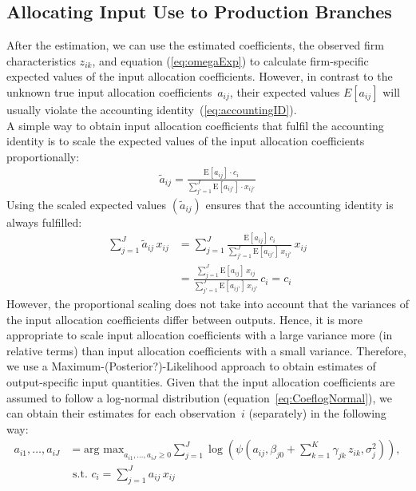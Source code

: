 \documentclass[12pt]{article}
\begin{document}
\subsection{Allocating Input Use to Production Branches}
\label{sec:obtaining-output-specific-input-quantities}
After the estimation, we can use the estimated coefficients, the observed firm characteristics $z_{ik}$, and equation (\ref{eq:omegaExp}) to calculate firm-specific expected values of the input allocation coefficients.
However, in contrast to the unknown true input allocation coefficients~$a_{ij}$, their expected values $E[a_{ij}]$ will usually violate the accounting identity~(\ref{eq:accountingID}). 
\\
A simple way to obtain input allocation coefficients that fulfil the accounting identity is to scale the expected values of the input allocation coefficients proportionally:
\begin{align}
\tilde{a}_{ij}=\frac{\text{E}[a_{ij}]\cdot c_i}{\sum_{j'=1}^J 
\text{E}[a_{ij'}]\cdot x_{ij'}}
\label{eq:omegaTilde}
\end{align}
Using the scaled expected values $(\tilde{a}_{ij})$
ensures that the accounting identity is always fulfilled:
\begin{align}
\sum_{j=1}^J \tilde{a}_{ij} \, x_{ij}
& = \sum_{j=1}^J 
    \frac{\text{E}[a_{ij}] \, c_{i} }{ 
        \sum_{j'=1}^J \text{E}[a_{ij'}] \, x_{ij'} }  \, x_{ij} \\
& = \frac{ \sum_{j=1}^J \text{E}[a_{ij}]  \, x_{ij} }{ 
        \sum_{j'=1}^J \text{E}[a_{ij'}] \, x_{ij'} }  \, c_{i} = c_{i}
\end{align}
However, the proportional scaling does not take into account that the variances of the input allocation coefficients differ between outputs.
Hence, it is more appropriate to scale input allocation coefficients with a large variance more (in relative terms) than input allocation coefficients with a small variance.
Therefore, we use a Maximum-(Posterior?)-Likelihood approach to obtain estimates of output-specific input quantities.
Given that the input allocation coefficients are assumed to follow a log-normal distribution (equation~\ref{eq:CoeflogNormal}), we can obtain their estimates for each observation~$i$ (separately) in the following way:
\begin{align}
    a_{i1}, \ldots, a_{iJ}
    & = \text{arg max}_{a_{i1}, \ldots, a_{iJ} \geq 0}
    \sum_{j=1}^J \log \left( \psi \left( a_{ij}, 
        \beta_{j0}+\sum_{k=1}^K \gamma_{jk} \, z_{ik},
    \sigma_{j}^2 \right) \right),
    \label{eq:maxLikOmegaConstrained}\\
    & \text{ s.t. } 
    c_{i} = \sum_{j=1}^J a_{ij} \, x_{ij} \nonumber
\end{align}
\end{document}
